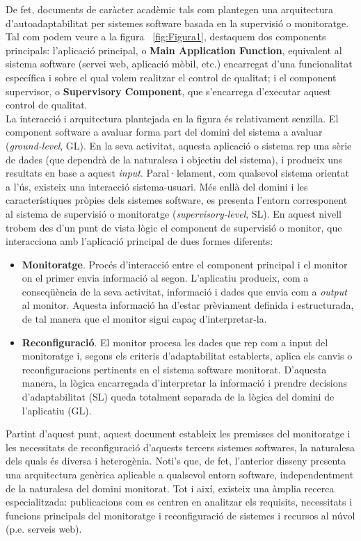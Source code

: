De fet, documents de caràcter acadèmic tals com \cite{nashville} plantegen una arquitectura d’autoadaptabilitat per sistemes software basada en la supervisió o monitoratge. Tal com podem veure a la figura ~\ref{fig:Figura1}, destaquem dos components principals: l’aplicació principal, o \textbf{Main Application Function}, equivalent al sistema software (servei web, aplicació mòbil, etc.) encarregat d'una funcionalitat específica i sobre el qual volem realitzar el control de qualitat; i el component supervisor, o \textbf{Supervisory Component}, que s'encarrega d'executar aquest control de qualitat.\\

La interacció i arquitectura plantejada en la figura és relativament senzilla. El component software a avaluar forma part del domini del sistema a avaluar (\textit{ground-level}, GL). En la seva activitat, aquesta aplicació o sistema rep una sèrie de dades (que dependrà de la naturalesa i objectiu del sistema), i produeix uns resultats en base a aquest \textit{input}. Paral·lelament, com qualsevol sistema orientat a l'ús, existeix una interacció sistema-usuari. Més enllà del domini i les característiques pròpies dels sistemes software, es presenta l'entorn corresponent al sistema de supervisió o monitoratge (\textit{supervisory-level}, SL). En aquest nivell trobem des d'un punt de vista lògic el component de supervisió o monitor, que interacciona amb l'aplicació principal de dues formes diferents:

\begin{itemize}
\item \textbf{Monitoratge}. Procés d'interacció entre el component principal i el monitor on el primer envia informació al segon. L'aplicatiu produeix, com a conseqüència de la seva activitat, informació i dades que envia com a \textit{output} al monitor. Aquesta informació ha d'estar prèviament definida i estructurada, de tal manera que el monitor sigui capaç d'interpretar-la.
\item \textbf{Reconfiguració}. El monitor procesa les dades que rep com a input del monitoratge i, segons els criteris d'adaptabilitat establerts, aplica els canvis o reconfiguracions pertinents en el sistema software monitorat. D'aquesta manera, la lògica encarregada d'interpretar la informació i prendre decisions d'adaptabilitat (SL) queda totalment separada de la lògica del domini de l'aplicatiu (GL).
\end{itemize}

Partint d'aquest punt, aquest document estableix les premisses del monitoratge i les necessitats de reconfiguració d’aquests tercers sistemes softwares, la naturalesa dels quals és diversa i heterogènia. Noti's que, de fet, l'anterior disseny presenta una arquitectura genèrica aplicable a qualsevol entorn software, independentment de la naturalesa del domini monitorat. Tot i així, existeix una àmplia recerca especialitzada: publicacions com \cite{napols} es centren en analitzar els requisits, necessitats i funcions principals del monitoratge i reconfiguració de sistemes i recursos al núvol (p.e. serveis web).\\

